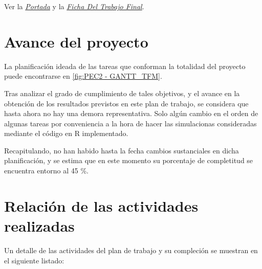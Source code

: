 \documentclass[IB,BIB]{TFUOC}%
\newcommand{\checkbox}{\text{\fboxsep=-.15pt\fbox{\rule{0pt}{1.5ex}\rule{1.5ex}{0pt}}}} %
\newcommand{\cmark}{\ding{51}} %
\newcommand{\xmark}{\ding{55}} %
\newcommand{\done}{\rlap{\checkbox}{\raisebox{1.2pt}{\large\hspace{1pt}\cmark}}
\hspace{-2.5pt}}
\newcommand{\wontfix}{\rlap{\checkbox}{\raisebox{-1.5pt}{\large\hspace{-.75pt}\xmark}}
\hspace{-2.5pt}}
\begin{document}
Ver la \textit{\hyperlink{portada}{Portada}} y la \textit{\hyperlink{ficha}{Ficha Del Trabajo Final}}. %


\section{Avance del proyecto}
\label{sec:Avance del proyecto}

La planificación ideada de las tareas que conforman la totalidad del proyecto puede encontrarse en \ref{fig:PEC2 - GANTT_TFM}.

Tras analizar el grado de cumplimiento de tales objetivos, y el avance en la obtención de los resultados previstos en este plan de trabajo, se considera que hasta ahora no hay una demora representativa. Solo algún cambio en el orden de algunas tareas por conveniencia a la hora de hacer las simulacionas consideradas mediante el código en R implementado. 

Recapitulando, no han habido hasta la fecha cambios sustanciales en dicha planificación, y se estima que en este momento su porcentaje de completitud se encuentra entorno al 45 \%.


\section{Relación de las actividades realizadas}
\label{sec:Relación de las actividades realizadas}

Un detalle de las actividades del plan de trabajo y su compleción se muestran en el siguiente listado:

\end{document}
